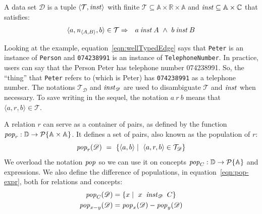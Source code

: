 \documentclass[runningheads]{llncs}
\newcommand{\id}[1]{\text{\it #1\/}}
\newcommand{\popF}[1]{\id{pop}_{#1}}
\newcommand{\pop}[2]{\popF{#1}(#2)}
\newcommand{\instance}{\mathbin{\id{inst}}}
\newcommand{\powerset}[1]{\cal{P}\{#1\}}
\newcommand{\declare}[3]{\id{#1}_{\pair{#2}{#3}}}
\newcommand{\pair}[2]{\langle{#1},{#2}\rangle}
\newcommand{\Pair}[2]{#1\times#2}
\newcommand{\triple}[3]{\langle{#1},{#2},{#3}\rangle}
\newcommand{\atom}[1]{{\tt\small #1}}
\newcommand{\Atoms}{\mathbb{A}}
\newcommand{\Concepts}{\mathbb{C}}
\newcommand{\Rels}{\mathbb{R}}   %
\newcommand{\triples}{\mathcal{T}}
\newcommand{\Triple}[3]{#1\times#2\times#3}
\newcommand{\dataset}{\mathscr{D}}
\newcommand{\Dataset}{\mathbb{D}}
\begin{document}
   \begin{definition}
   A data set $\dataset$ is a tuple $\pair{\triples}{\instance}$ with finite $\triples \subseteq {\Triple{\Atoms}{\Rels}{\Atoms}}$ and $\instance\subseteq\Pair{\Atoms}{\Concepts}$ that satisfies:
\begin{eqnarray}
   \triple{a}{\declare{n}{A}{B}}{b}\in\triples&\Rightarrow&a\instance A\ \wedge\ b\instance B
\label{eqn:wellTypedEdge}
\end{eqnarray}
\end{definition}
   Looking at the example,
   equation~\ref{eqn:wellTypedEdge} says that \atom{Peter} is an instance of {\tt Person} and \atom{074238991} is an instance of {\tt TelephoneNumber}.
   In practice, users can say that the Person Peter has telephone number 074238991.
   So, the ``thing'' that \atom{Peter} refers to (which is Peter) has \atom{074238991} as a telephone number.
   The notations $\triples_{\dataset}$ and $\instance_{\dataset}$ are used to disambiguate $\triples$ and $\instance$ when necessary.
   To save writing in the sequel, the notation $a\ r\ b$ means that $\triple{a}{r}{b}\in\triples$.

   A relation $r$ can serve as a container of pairs,
   as defined by the function $\popF{r}:\Dataset\rightarrow\powerset{\Pair{\Atoms}{\Atoms}}$.
   It defines a set of pairs, also known as the population of $r$:
\begin{equation}
   \pop{r}{\dataset}\ =\ \{ \pair{a}{b}\mid\ \triple{a}{r}{b}\in\triples_{\dataset}\}
\label{eqn:pop-rel}
\end{equation}
%
   We overload the notation $\popF{}$ so we can use it on concepts $\popF{C}:\Dataset\rightarrow\powerset{\Atoms}$
   and expressions. We also define the difference of populations, in equation~\ref{eqn:pop-expr}, both for relations and concepts:
\begin{align}
   \pop{C}{\dataset}&= \{ x\mid\ x\ \instance_{\dataset}\ C\}
\label{eqn:pop-concept}\\
   \pop{x-y}{\dataset}&= \pop{x}{\dataset} - \pop{y}{\dataset}
\label{eqn:pop-expr}
\end{align}
\end{document}

